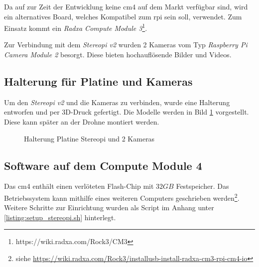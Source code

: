 Da auf zur Zeit der Entwicklung keine \gls{cm4} auf dem Markt verfügbar sind, wird ein alternatives Board, welches Kompatibel zum \gls{rpi} sein soll, verwendet. Zum Einsatz kommt ein \textit{Radxa Compute Module 3}\footnote{https://wiki.radxa.com/Rock3/CM3}.

Zur Verbindung mit dem \textit{Stereopi v2} wurden 2 Kameras vom Typ \textit{Raspberry Pi Camera Module 2} besorgt. Diese bieten hochauflösende Bilder und Videos.

\subsection{Halterung für Platine und Kameras}
Um den \textit{Stereopi v2} und die Kameras zu verbinden, wurde eine Halterung entworfen und per 3D-Druck gefertigt. Die Modelle werden in Bild \ref{fig:stereopi_halterung} vorgestellt. Diese kann später an der Drohne montiert werden.

\begin{figure}[!ht]
    \centering
    \hfill
    \hfill
    \caption[Halterung Platine Stereopi und 2 Kameras]{Halterung Platine Stereopi und 2 Kameras}
    \label{fig:stereopi_halterung}
\end{figure}

\subsection{Software auf dem Compute Module 4}
Das \gls{cm4} enthält einen verlöteten Flash-Chip mit $32GB$ Festspeicher. Das Betriebssystem kann mithilfe eines weiteren Computers geschrieben werden\footnote{siehe \url{https://wiki.radxa.com/Rock3/installusb-install-radxa-cm3-rpi-cm4-io}}. Weitere Schritte zur Einrichtung wurden als Script im Anhang unter \ref{listing:setup_stereopi.sh} hinterlegt. 

